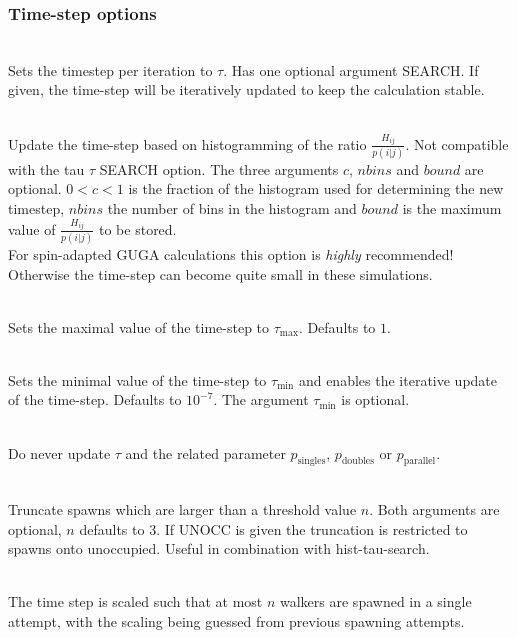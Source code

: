 \documentclass[a4paper,notitlepage,dvipsnames]{scrreprt}
\newcommand\codeitem[1]{\needspace{1.5\baselineskip}\item[\textnormal{\ttfamily #1 \nopagebreak}] \hfill \\ \nopagebreak}
\begin{document}
  \subsubsection{Time-step options}
  \begin{description}
    \codeitem{\textcolor{mred}{tau $\tau$} [SEARCH]}
    Sets the timestep per iteration to $\tau$. Has one optional argument
    SEARCH. If given, the time-step will be iteratively updated to keep the
    calculation stable.
    \codeitem{\textcolor{oblue}{hist-tau-search [$c$ $nbins$ $bound$]}}
    Update the time-step based on histogramming of the ratio
    $\frac{H_{ij}}{p(i|j)}$. Not compatible with the tau $\tau$ SEARCH
    option. The three arguments $c$, $nbins$ and $bound$ are
    optional. $0<c<1$ is the fraction of the histogram used for determining
    the new timestep, $nbins$ the number of bins in the histogram and $bound$
    is the maximum value of $\frac{H_{ij}}{p(i|j)}$ to be stored.\\
    For spin-adapted GUGA calculations this option is \emph{highly} recommended! Otherwise the time-step can become quite small in these simulations.
    \codeitem{\textcolor{oblue}{max-tau $\tau_\text{max}$}}
    Sets the maximal value of the time-step to $\tau_\text{max}$. Defaults to
    $1$.
    \codeitem{min-tau [$\tau_\text{min}$]}
    Sets the minimal value of the time-step to $\tau_\text{min}$ and enables
    the iterative update of the time-step. Defaults to
    $10^{-7}$. The argument $\tau_\text{min}$ is optional.
    \codeitem{keepTauFixed}
    Do never update $\tau$ and the related parameter $p_\text{singles}$,
    $p_\text{doubles}$ or $p_\text{parallel}$.
    \codeitem{truncate-spawns [$n$ UNOCC]}
    Truncate spawns which are larger than a threshold value $n$. Both
    arguments are optional, $n$ defaults to $3$. If UNOCC is given the
    truncation is restricted to spawns onto unoccupied. Useful in combination
    with hist-tau-search.
    \codeitem{maxWalkerBloom $n$}
    The time step is scaled such that at most $n$ walkers are spawned in a
    single attempt, with the scaling being guessed from previous spawning attempts.
  \end{description}
\end{document}
